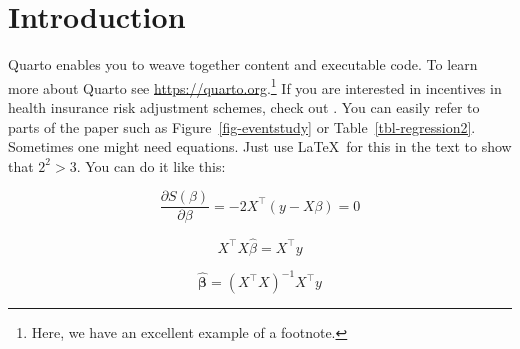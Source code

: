 \documentclass[12pt,a4paper,oneside]{article} %
\begin{document}
\begin{abstract}
	\vspace{-15pt}	
\end{abstract}
\thispagestyle{empty}

\clearpage
\setcounter{page}{1}
\clearpage
\newpage{}

\section{Introduction}\label{introduction}

Quarto enables you to weave together content and executable code. To
learn more about Quarto see \url{https://quarto.org}.\footnote{Here, we
  have an excellent example of a footnote.} If you are interested in
incentives in health insurance risk adjustment schemes, check out
\textcite{reifSettingIncentivesRight2024}. You can easily refer to parts
of the paper such as Figure~\ref{fig-eventstudy} or
Table~\ref{tbl-regression2}. Sometimes one might need equations. Just
use \LaTeX~for this in the text to show that \(2^{2} > 3\). You can do
it like this:

\begin{equation}
\frac{\partial S(\beta)}{\partial \beta} = -2X^\top (y - X\beta) = 0
\end{equation}

\begin{equation}
X^\top X \hat{\beta} = X^\top y
\end{equation}

\begin{equation}
\hat{\bm{\beta}} = (X^\top X)^{-1} X^\top y
\end{equation}
\end{document}
